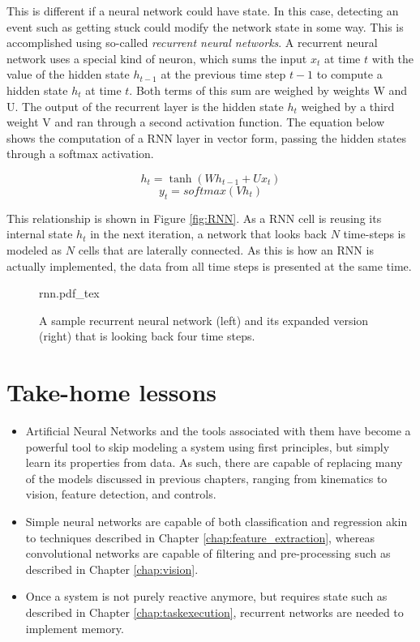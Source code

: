 This is different if a neural network could have state. In this case, detecting an event such as getting stuck could modify the network state in some way. This is accomplished using so-called \emph{recurrent neural networks}. A recurrent neural network uses a special kind of neuron, which sums the input $x_t$ at time $t$ with the value of the hidden state $h_{t-1}$ at the previous time step $t-1$ to compute a hidden state $h_t$ at time $t$. Both terms of this sum are weighed by weights W and U. The output of the recurrent layer is the hidden state $h_t$ weighed by a third weight V and ran through a second activation function. The equation below shows the computation of a RNN layer in vector form, passing the hidden states through a softmax activation.

\begin{equation}
h_t = \tanh(Wh_{t-1}+Ux_t)
\end{equation}
\begin{equation}
y_t = softmax(Vh_t)
\end{equation}

This relationship is shown in Figure \ref{fig:RNN}. As a RNN cell is reusing its internal state $h_t$ in the next iteration, a network that looks back $N$ time-steps is modeled as $N$ cells that are laterally connected. As this is how an RNN is actually implemented, the data from all time steps is presented at the same time.  

\begin{figure}[htb]
\tiny
    \centering
    \def\svgwidth{\textwidth}
    {rnn.pdf_tex}
    \caption{A sample recurrent neural network (left) and its expanded version (right) that is looking back four time steps. \label{fig:rnn}}
\end{figure}

\section*{Take-home lessons}
\begin{itemize}
\item Artificial Neural Networks and the tools associated with them have become a powerful tool to skip modeling a system using first principles, but simply learn its properties from data. As such, there are capable of replacing many of the models discussed in previous chapters, ranging from kinematics to vision, feature detection, and controls.
\item Simple neural networks are capable of both classification and regression akin to techniques described in Chapter \ref{chap:feature_extraction}, whereas convolutional networks are capable of filtering and pre-processing such as described in Chapter \ref{chap:vision}.
\item Once a system is not purely reactive anymore, but requires state such as described in Chapter \ref{chap:taskexecution}, recurrent networks are needed to implement memory. 
\end{itemize}

